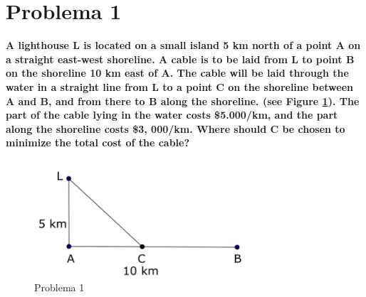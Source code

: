 \section*{Problema 1}
\textbf{A lighthouse L is located on a small island 5 km north of a point A on a straight east-west shoreline. A cable is to be laid from L to point B on the shoreline 10 km east of A. The cable will be laid through the water in a straight line from L to a point C on the shoreline between A and B, and from there to B along the shoreline. (see Figure \ref{fig:problema1}). The part of the cable lying in the water costs \$5.000/km, and the part along the shoreline costs \$3, 000/km. Where should C be chosen to minimize the total cost of the cable?}

\begin{figure}[H]
    \centering
    \includegraphics[width=8cm]{Graphics/problem1.png}
    \caption{Problema 1}
    \label{fig:problema1}
\end{figure}